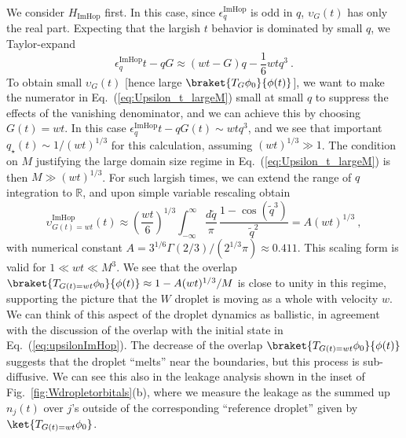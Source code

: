 \documentclass[prx,letterpaper,aps,superscriptaddress,floatfix,twocolumn,nofootinbib]{revtex4-2}
\theoremstyle{definition}
\begin{document}
%
We consider $H_{\text{ImHop}}$ first.
%
In this case, since $\epsilon^{\text{ImHop}}_q$ is odd in $q$, $\upsilon_G(t)$ has only the real part.
%
Expecting that the largish $t$ behavior is dominated by small $q$, we Taylor-expand
\begin{equation}
\epsilon_q^{\text{ImHop}} t - q G \approx (wt - G) q - \frac{1}{6} w t q^3 ~.
\end{equation}
%
To obtain small $\upsilon_G(t)$ [hence large $\braket{T_G\phi_0}{\phi(t)}$], we want to make the numerator in Eq.~(\ref{eq:Upsilon_t_largeM}) small at small $q$ to suppress the effects of the vanishing denominator, and we can achieve this by choosing $G(t) = wt$.
%
In this case $\epsilon_q^{\text{ImHop}} t - q G(t) \sim w t q^3$, and we see that important $q_\star(t) \sim 1/(w t)^{1/3}$ for this calculation, assuming $(w t)^{1/3} \gg 1$.
%
The condition on $M$ justifying the large domain size regime in Eq.~(\ref{eq:Upsilon_t_largeM}) is then $M \gg (w t)^{1/3}$.
%
For such largish times, we can extend the range of $q$ integration to $\mathbb{R}$, and upon simple variable rescaling obtain
\begin{equation}
\upsilon_{G(t)=wt}^{\text{ImHop}}(t) \approx \left(\frac{wt}{6}\right)^{1/3} \int_{-\infty}^\infty \frac{d\tilde{q}}{\pi} \, \frac{1 - \cos(\tilde{q}^3)}{\tilde{q}^2} = A (wt)^{1/3} ~,
\label{eq:upsilon_Gwt_ImHop}
\end{equation}
with numerical constant $A = 3^{1/6} \Gamma(2/3)/(2^{1/3} \pi) \approx 0.411$.
%
This scaling form is valid for $1 \ll wt \ll M^3$.
%
We see that the overlap $\braket{T_{G(t)=wt} \phi_0}{\phi(t)} \approx 1 - A (wt)^{1/3}/M$ is close to unity in this regime, supporting the picture that the $W$ droplet is moving as a whole with velocity $w$.
%
We can think of this aspect of the droplet dynamics as ballistic, in agreement with the discussion of the overlap with the initial state in Eq.~(\ref{eq:upsilonImHop}).
%
The decrease of the overlap $\braket{T_{G(t)=wt} \phi_0}{\phi(t)}$ suggests that the droplet ``melts'' near the boundaries, but this process is sub-diffusive.
%
We can see this also in the leakage analysis shown in the inset of Fig.~\ref{fig:Wdropletorbitals}(b), where we measure the leakage as the summed up $n_j(t)$ over $j$'s outside of the corresponding ``reference droplet'' given by $\ket{T_{G(t)=wt} \phi_0}$.
%
\end{document}
